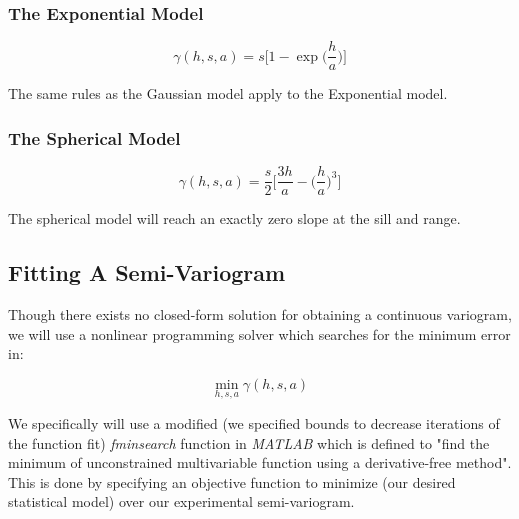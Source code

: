 \documentclass[11pt]{ucthesis}
\begin{document}
\subsubsection{The Exponential Model}

\begin{equation}
	\gamma(h, s, a) = s \Bigg[ 1 - \exp \Bigg( \dfrac{h}{a} \Bigg) \Bigg]
	\label{eq:exp_model}
\end{equation}

The same rules as the Gaussian model apply to the Exponential model.

\subsubsection{The Spherical Model}

\begin{equation}
	\gamma(h, s, a) = \frac{s}{2} \Bigg[ \dfrac{3h}{a} - \Bigg( \dfrac{h}{a} \Bigg)^3 \Bigg]
	\label{eq:sph_model}
\end{equation}

The spherical model will reach an exactly zero slope at the sill and range.

\subsection{Fitting A Semi-Variogram}

Though there exists no closed-form solution for obtaining a continuous variogram, we will use a nonlinear programming solver which searches for the minimum error in:

\begin{equation}
\min\limits_{h, s, a}\gamma(h, s, a)
\end{equation}

We specifically will use a modified (we specified bounds to decrease iterations of the function fit) \textit{fminsearch} function in \textit{MATLAB} which is defined to "find the minimum of unconstrained multivariable function using a derivative-free method". This is done by specifying an objective function to minimize (our desired statistical model) over our experimental semi-variogram.
\end{document}
